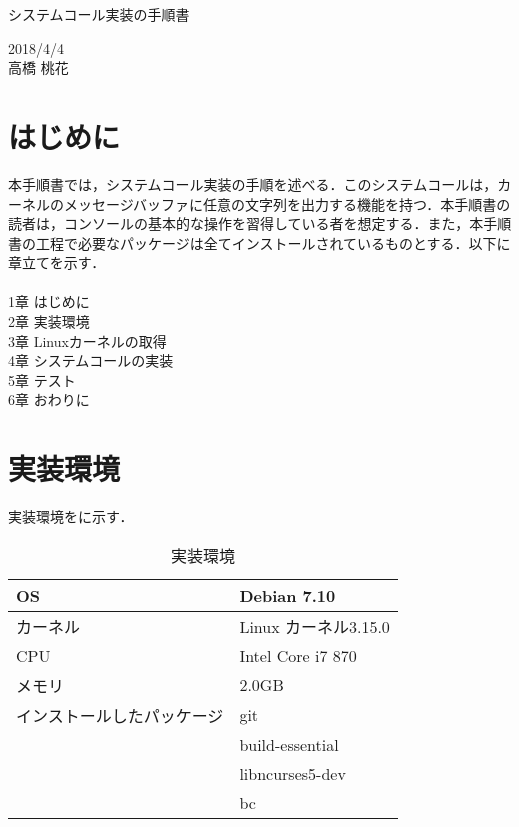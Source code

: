 \documentclass[12pt]{jsarticle}
\begin{document}
\begin{center}
{\LARGE システムコール実装の手順書}
\end{center}

\begin{flushright}
  2018/4/4\\
  高橋 桃花
\end{flushright}
\section{はじめに}
\label{sec:introduction}
本手順書では，システムコール実装の手順を述べる．このシステムコールは，カーネルのメッセージバッファに任意の文字列を出力する機能を持つ．本手順書の読者は，コンソールの基本的な操作を習得している者を想定する．また，本手順書の工程で必要なパッケージは全てインストールされているものとする．以下に章立てを示す． \\ \\
1章 はじめに \\
2章 実装環境 \\
3章 Linuxカーネルの取得 \\
4章 システムコールの実装 \\
5章 テスト \\
6章 おわりに \\

\section{実装環境}
\label{sec:devenv}
実装環境をに示す．

\begin{table}[h]
  \begin{center}
    \caption{実装環境}\label{tab:devenv_table}
    \begin{tabular}{l|l}
      \hline \hline
      OS & Debian 7.10 \\ \hline
      カーネル & Linux カーネル3.15.0 \\ \hline
      CPU & Intel Core i7 870 \\ \hline
      メモリ & 2.0GB \\ \hline
      インストールしたパッケージ & git \\ 
      & build-essential \\ 
      & libncurses5-dev \\ 
      & bc \\ \hline
      
    \end{tabular}
  \end{center}
\end{table}
\end{document}
